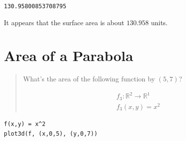 \documentclass[letterpaper]{article}
\begin{document}
\begin{verbatim}
130.95800853708795
\end{verbatim}


It appears that the surface area is about \(130.958\) units.

\section{Area of a Parabola}
\label{sec:org212a7c6}
\begin{quote}
What's the area of the following function by \((5,7)\)?

\begin{align}
   &f_3: \mathbb{R}^2 \to \mathbb{R}^1 \\ 
&f_3(x,y) = x^2
\end{align}
\end{quote}

\begin{verbatim}
f(x,y) = x^2
plot3d(f, (x,0,5), (y,0,7))
\end{verbatim}
\end{document}
